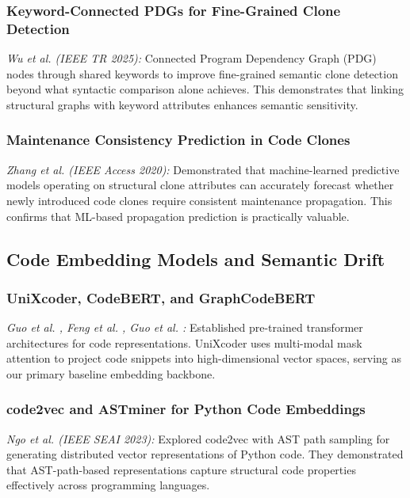 \documentclass[conference]{IEEEtran}
\begin{document}
\subsubsection{Keyword-Connected PDGs for Fine-Grained Clone Detection}
\emph{Wu et al. \cite{Wu2025} (IEEE TR 2025):} Connected Program Dependency Graph (PDG) nodes through shared keywords to improve fine-grained semantic clone detection beyond what syntactic comparison alone achieves. This demonstrates that linking structural graphs with keyword attributes enhances semantic sensitivity.

\subsubsection{Maintenance Consistency Prediction in Code Clones}
\emph{Zhang et al. \cite{Zhang2020} (IEEE Access 2020):} Demonstrated that machine-learned predictive models operating on structural clone attributes can accurately forecast whether newly introduced code clones require consistent maintenance propagation. This confirms that ML-based propagation prediction is practically valuable.

\subsection{Code Embedding Models and Semantic Drift}

\subsubsection{UniXcoder, CodeBERT, and GraphCodeBERT}
\emph{Guo et al. \cite{guo2022unixcoder}, Feng et al. \cite{feng2020codebert}, Guo et al. \cite{guo2020graphcodebert}:} Established pre-trained transformer architectures for code representations. UniXcoder uses multi-modal mask attention to project code snippets into high-dimensional vector spaces, serving as our primary baseline embedding backbone.

\subsubsection{code2vec and ASTminer for Python Code Embeddings}
\emph{Ngo et al. \cite{Ngo2023} (IEEE SEAI 2023):} Explored code2vec with AST path sampling for generating distributed vector representations of Python code. They demonstrated that AST-path-based representations capture structural code properties effectively across programming languages.
\end{document}
